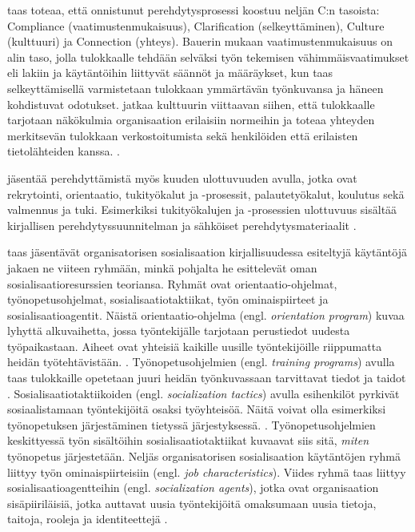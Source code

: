 \documentclass[utf8]{gradu3}
\begin{document}
\textcite{bauer-2010} taas toteaa, että onnistunut perehdytysprosessi koostuu neljän C:n tasoista: Compliance (vaatimustenmukaisuus), Clarification (selkeyttäminen), Culture (kulttuuri) ja Connection (yhteys). Bauerin mukaan vaatimustenmukaisuus on alin taso, jolla tulokkaalle tehdään selväksi työn tekemisen vähimmäisvaatimukset eli lakiin ja käytäntöihin liittyvät säännöt ja määräykset, kun taas selkeyttämisellä varmistetaan tulokkaan ymmärtävän työnkuvansa ja häneen kohdistuvat odotukset. \textcite{bauer-2010} jatkaa kulttuurin viittaavan siihen, että tulokkaalle tarjotaan näkökulmia organisaation erilaisiin normeihin ja toteaa yhteyden merkitsevän tulokkaan verkostoitumista sekä henkilöiden että erilaisten tietolähteiden kanssa. \parencite{bauer-2010}.

\textcite{bauer-2010} jäsentää perehdyttämistä myös kuuden ulottuvuuden avulla, jotka ovat rekrytointi, orientaatio, tukityökalut ja -prosessit, palautetyökalut, koulutus sekä valmennus ja tuki. Esimerkiksi tukityökalujen ja -prosessien ulottuvuus sisältää kirjallisen perehdytyssuunnitelman ja sähköiset perehdytysmateriaalit \parencite{bauer-2010}.

\textcite{saks-gruman-2012} taas jäsentävät organisatorisen sosialisaation kirjallisuudessa esiteltyjä käytäntöjä jakaen ne viiteen ryhmään, minkä pohjalta he esittelevät oman sosialisaatioresurssien teoriansa. Ryhmät ovat orientaatio-ohjelmat, työnopetusohjelmat, sosialisaatiotaktiikat, työn ominaispiirteet ja sosialisaatioagentit. Näistä orientaatio-ohjelma (engl. \textit{orientation program}) kuvaa lyhyttä alkuvaihetta, jossa työntekijälle tarjotaan perustiedot uudesta työpaikastaan. Aiheet ovat yhteisiä kaikille uusille työntekijöille riippumatta heidän työtehtävistään. \parencite{saks-gruman-2012}. Työnopetusohjelmien (engl. \textit{training programs}) avulla taas tulokkaille opetetaan juuri heidän työnkuvassaan tarvittavat tiedot ja taidot \parencite{saks-gruman-2012}. Sosialisaatiotaktiikoiden (engl. \textit{socialization tactics}) avulla esihenkilöt pyrkivät sosiaalistamaan työntekijöitä osaksi työyhteisöä. Näitä voivat olla esimerkiksi työnopetuksen järjestäminen tietyssä järjestyksessä. \parencite{saks-gruman-2012}. Työnopetusohjelmien keskittyessä työn sisältöihin sosialisaatiotaktiikat kuvaavat siis sitä, \textit{miten} työnopetus järjestetään. Neljäs organisatorisen sosialisaation käytäntöjen ryhmä liittyy työn ominaispiirteisiin (engl. \textit{job characteristics}). Viides ryhmä taas liittyy sosialisaatioagentteihin (engl. \textit{socialization agents}), jotka ovat organisaation sisäpiiriläisiä, jotka auttavat uusia työntekijöitä omaksumaan uusia tietoja, taitoja, rooleja ja identiteettejä \parencite{saks-gruman-2012}.
\end{document}

